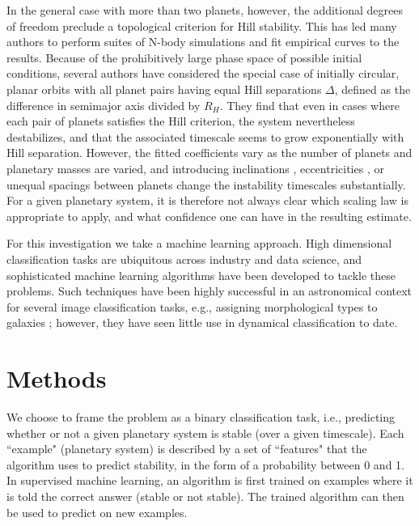 In the general case with more than two planets, however, the additional degrees of freedom preclude a topological criterion for Hill stability.
This has led many authors to perform suites of N-body simulations and fit empirical curves to the results.
Because of the prohibitively large phase space of possible initial conditions, several authors \citep[][Obertas et al., submitted]{Chambers96, Faber07, Smith09} have considered the special case of initially circular, planar orbits with all planet pairs having equal Hill separations $\Delta$, defined as the difference in semimajor axis divided by $R_H$.
They find that even in cases where each pair of planets satisfies the Hill criterion, the system nevertheless destabilizes, and that the associated timescale seems to grow exponentially with Hill separation.
However, the fitted coefficients vary as the number of planets and planetary masses are varied, and introducing inclinations \citep{Marzari02}, eccentricities \citep{Ito99, Chatterjee08, Pu15}, or unequal spacings between planets \citep{Marzari14} change the instability timescales substantially.
For a given planetary system, it is therefore not always clear which scaling law is appropriate to apply, and what confidence one can have in the resulting estimate.

For this investigation we take a machine learning approach.
High dimensional classification tasks are ubiquitous across industry and data science, and sophisticated machine learning algorithms have been developed to tackle these problems.
Such techniques have been highly successful in an astronomical context for several image classification tasks, e.g., assigning morphological types to galaxies \citep{Collister04}; however, they have seen little use in dynamical classification to date\citep[see][for a recent counterexample]{Petrovich15}.
 
\section{Methods}
We choose to frame the problem as a binary classification task, i.e., predicting whether or not a given planetary system is stable (over a given timescale).
Each ``example" (planetary system) is described by a set of ``features" that the algorithm uses to predict stability, in the form of a probability between 0 and 1.
In supervised machine learning, an algorithm is first trained on examples where it is told the correct answer (stable or not stable).
The trained algorithm can then be used to predict on new examples.

